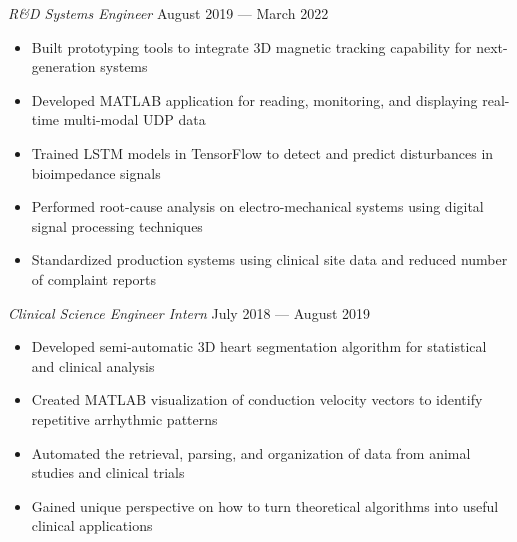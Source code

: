\documentclass{article}
\begin{document}
\textit{R\&D Systems Engineer} \hfill August 2019 --- March 2022\\
\vspace{-2mm}
\begin{itemize} \itemsep 0.05pt
	\item Built prototyping tools to integrate 3D magnetic tracking capability for next-generation systems
	\item Developed MATLAB application for reading, monitoring, and displaying real-time multi-modal UDP data
	\item Trained LSTM models in TensorFlow to detect and predict disturbances in bioimpedance signals
	\item Performed root-cause analysis on electro-mechanical systems using digital signal processing techniques
	\item Standardized production systems using clinical site data and reduced number of complaint reports
\end{itemize}

\textit{Clinical Science Engineer Intern} \hfill July 2018 --- August 2019\\
\vspace{-2mm}
\begin{itemize} \itemsep 0.05pt
	\item Developed semi-automatic 3D heart segmentation algorithm for statistical and clinical analysis
	\item Created MATLAB visualization of conduction velocity vectors to identify repetitive arrhythmic patterns
	\item Automated the retrieval, parsing, and organization of data from animal studies and clinical trials
	\item Gained unique perspective on how to turn theoretical algorithms into useful clinical applications
\end{itemize}

\end{document}

